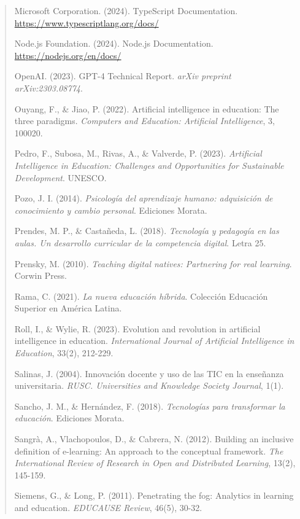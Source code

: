 \documentclass[12pt,a4paper]{report}
\begin{document}
\begin{quote}
\begin{thebibliography}{99}
Microsoft Corporation. (2024). TypeScript Documentation. \url{https://www.typescriptlang.org/docs/}

Node.js Foundation. (2024). Node.js Documentation. \url{https://nodejs.org/en/docs/}

OpenAI. (2023). GPT-4 Technical Report. \textit{arXiv preprint arXiv:2303.08774}.

Ouyang, F., \& Jiao, P. (2022). Artificial intelligence in education: The three paradigms. \textit{Computers and Education: Artificial Intelligence}, 3, 100020.

Pedro, F., Subosa, M., Rivas, A., \& Valverde, P. (2023). \textit{Artificial Intelligence in Education: Challenges and Opportunities for Sustainable Development}. UNESCO.

Pozo, J. I. (2014). \textit{Psicología del aprendizaje humano: adquisición de conocimiento y cambio personal}. Ediciones Morata.

Prendes, M. P., \& Castañeda, L. (2018). \textit{Tecnología y pedagogía en las aulas. Un desarrollo curricular de la competencia digital}. Letra 25.

Prensky, M. (2010). \textit{Teaching digital natives: Partnering for real learning}. Corwin Press.

Rama, C. (2021). \textit{La nueva educación híbrida}. Colección Educación Superior en América Latina.

Roll, I., \& Wylie, R. (2023). Evolution and revolution in artificial intelligence in education. \textit{International Journal of Artificial Intelligence in Education}, 33(2), 212-229.

Salinas, J. (2004). Innovación docente y uso de las TIC en la enseñanza universitaria. \textit{RUSC. Universities and Knowledge Society Journal}, 1(1).

Sancho, J. M., \& Hernández, F. (2018). \textit{Tecnologías para transformar la educación}. Ediciones Morata.

Sangrà, A., Vlachopoulos, D., \& Cabrera, N. (2012). Building an inclusive definition of e-learning: An approach to the conceptual framework. \textit{The International Review of Research in Open and Distributed Learning}, 13(2), 145-159.

Siemens, G., \& Long, P. (2011). Penetrating the fog: Analytics in learning and education. \textit{EDUCAUSE Review}, 46(5), 30-32.


\end{thebibliography}
\end{quote}
\end{document}
